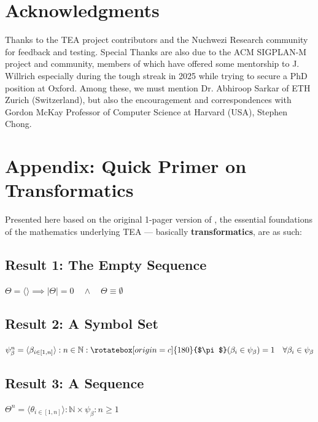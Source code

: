 \documentclass[sigplan,screen]{acmart}
\newcommand{\invpi}[1]{\mathop{\rotatebox[origin=c]{180}{$\pi$}}#1}
\begin{document}
\section*{Acknowledgments}
\label{SECACK}

Thanks to the TEA project contributors and the Nuchwezi Research community for feedback and testing. Special Thanks are also due to the ACM SIGPLAN-M project and community, members of which have offered some mentorship to J. Willrich especially during the tough streak in 2025 while trying to secure a PhD position at Oxford. Among these, we must mention Dr. Abhiroop Sarkar of ETH Zurich (Switzerland), but also the encouragement and correspondences with Gordon McKay Professor of Computer Science at Harvard (USA), Stephen Chong.

\section*{Appendix: Quick Primer on Transformatics}
\label{SEC11}

\noindent Presented here based on the original 1-pager version \cite{lutalo_2025_trans101_1page} of \cite{Lutalo2025_transformatics_thesis}, the essential foundations of the mathematics underlying TEA --- basically \textbf{transformatics}, are as such:

\subsection{Result 1: The Empty Sequence\cite{lnspaper}}
\label{RES1}

$\Theta = \langle \rangle \implies |\Theta| = 0 \quad \land \quad \Theta \equiv \emptyset$

\subsection{Result 2: A Symbol Set\cite{Lutalo2024gtnc}}

$\psi_\beta^n = \langle \beta_{i \in [1,n]} \rangle : n \in \mathbb{N} : \invpi(\beta_i \in \psi_\beta) = 1 \quad \forall \beta_i \in \psi_\beta$

\subsection{Result 3: A Sequence\cite{lnspaper}}
\label{RES3}

$\Theta^n = \langle \theta_{i \in [1,n]} \rangle : \mathbb{N} \times \psi_\beta : n \geq 1$
\end{document}
